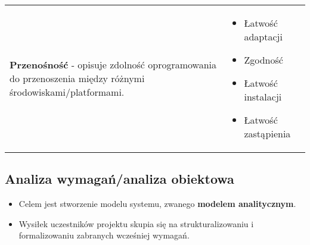 \documentclass[a4paper]{article}
\begin{document}
\begin{table}[H]
\begin{center}
\begin{tabular}{  p{8cm} p{8cm} }
                \cmidrule(r){1-1}\cmidrule(l){2-2}

                \textbf{Przenośność} - opisuje zdolność oprogramowania do przenoszenia między różnymi środowiskami/platformami.
                &
                \begin{itemize}
                    \item Łatwość adaptacji
                    \item Zgodność
                    \item Łatwość instalacji
                    \item Łatwość zastąpienia
                \end{itemize}
                \\


            \end{tabular}
        \end{center}
    \end{table}




    \subsection{Analiza wymagań/analiza obiektowa}
    \begin{itemize}
        \item Celem jest stworzenie modelu systemu, zwanego \textbf{modelem analitycznym}.
        \item Wysiłek uczestników projektu skupia się na strukturalizowaniu i formalizowaniu zabranych
        wcześniej wymagań.
    \end{itemize}
\end{document}
